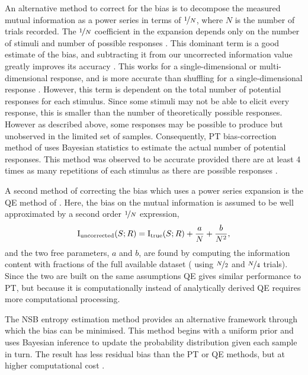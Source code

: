 An alternative method to correct for the bias is to decompose the measured mutual information as a power series in terms of $\nicefrac{1}{N}$, where $N$ is the number of trials recorded.
The $\nicefrac{1}{N}$ coefficient in the expansion depends only on the number of stimuli and number of possible responses \citep{Miller1955,Treves1995}.
This dominant term is a good estimate of the bias, and subtracting it from our uncorrected information value greatly improves its accuracy \citep{Treves1995}.
This works for a single-dimensional or multi-dimensional response, and is more accurate than shuffling for a single-dimensional response \citep{Panzeri1996}.
However, this term is dependent on the total number of potential responses for each stimulus.
Since some stimuli may not be able to elicit every response, this is smaller than the number of theoretically possible responses.
However as described above, some responses may be possible to produce but unobserved in the limited set of samples.
Consequently, \ac{PT} bias-correction method of \citet{Panzeri1996} uses Bayesian statistics to estimate the actual number of potential responses.
This method was observed to be accurate provided there are at least 4 times as many repetitions of each stimulus as there are possible responses \citep{Panzeri2007}.

A second method of correcting the bias which uses a power series expansion is the \ac{QE} method of \citet{Strong1998}.
Here, the bias on the mutual information is assumed to be well approximated by a second order $\nicefrac{1}{N}$ expression,
\begin{equation}
\operatorname{I}_{\text{uncorrected}}(S;R) =
\operatorname{I}_{\text{true}}(S;R) + \frac{a}{N} + \frac{b}{N^2}
,\end{equation}
and the two free parameters, $a$ and $b$, are found by computing the information content with fractions of the full available dataset (\ie{} using $\nicefrac{N}{2}$ and $\nicefrac{N}{4}$ trials).
Since the two are built on the same assumptions \ac{QE} gives similar performance to \ac{PT}, but because it is computationally instead of analytically derived \ac{QE} requires more computational processing.


The \ac{NSB} entropy estimation method \citep{Nemenman2004} provides an alternative framework through which the bias can be minimised.
This method begins with a uniform prior and uses Bayesian inference to update the probability distribution given each sample in turn.
The result has less residual bias than the \ac{PT} or \ac{QE} methods, but at higher computational cost \citep{Panzeri2007}.

